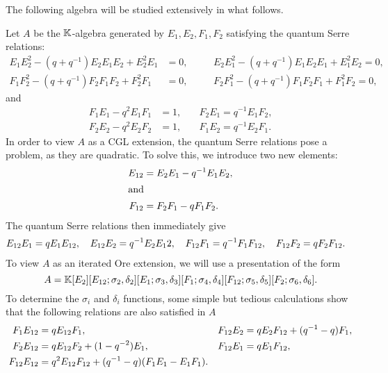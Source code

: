The following algebra will be studied extensively in what follows.
\begin{example}
	Let $A$ be the $\mathbb{K}$-algebra generated by $E_1, E_2, F_1, F_2$ satisfying the quantum Serre relations:
	\begin{align*}
		E_1 E_2^2 - (q + q^{-1}) E_2 E_1 E_2 + E_2^2 E_1 & = 0,\quad &  & E_2 E_1^2 - (q + q^{-1}) E_1 E_2 E_1 + E_1^2 E_2 = 0, \\
		F_1 F_2^2 - (q + q^{-1}) F_2 F_1 F_2 + F_2^2 F_1 & = 0,\quad &  & F_2 F_1^2 - (q + q^{-1}) F_1 F_2 F_1 + F_1^2 F_2 = 0,
	\end{align*}
	and
	\begin{align*}
		F_1 E_1 - q^2 E_1 F_1 & = 1, \quad & F_2 E_1 = q^{-1}E_1 F_2, \\
		F_2 E_2 - q^2 E_2 F_2 & = 1, \quad & F_1 E_2 = q^{-1}E_2 F_1.
	\end{align*}
	In order to view $A$ as a CGL extension, the quantum Serre relations pose a problem, as
	they are quadratic. To solve this, we introduce two new elements:
	\begin{align*}
		E_{12} & = E_2 E_1 - q^{-1}E_1 E_2, \\
		\shortintertext{and}
		F_{12} & = F_2 F_1 - qF_1 F_2.
	\end{align*}
	The quantum Serre relations then immediately give
	\begin{align*}
		E_{12}E_1 & = q E_1 E_{12}, \quad E_{12}E_2 = q^{-1} E_2 E_12, \quad F_{12}F_1 = q^{-1} F_1 F_{12}, \quad F_{12}F_2 = q F_2 F_{12}.
	\end{align*}
	To view $A$ as an iterated Ore extension, we will use a presentation of the form
	\begin{equation*}
		A = \mathbb{K}[E_2][E_{12}; \sigma_2, \delta_2][E_1;\sigma_3, \delta_3][F_1; \sigma_4, \delta_4][F_{12}; \sigma_5, \delta_5][F_2; \sigma_6, \delta_6].
	\end{equation*}
	To determine the $\sigma_i$ and $\delta_i$ functions, some simple but tedious
	calculations show that the following relations are also satisfied in $A$
	\begin{align*}
		F_1 E_{12}   & = q E_{12} F_1,                                        &  & F_{12}E_2 = q E_2 F_{12} + (q^{-1} - q) F_1, \\
		F_2 E_{12}   & = q E_{12}F_2 + (1 -q^{-2})E_1,                        &  & F_{12}E_1 = q E_1 F_{12},                   \\
		F_{12}E_{12} & = q^2 E_{12} F_{12} + (q^{-1} - q) (F_1 E_1 - E_1 F_1).
	\end{align*}

\end{example}
